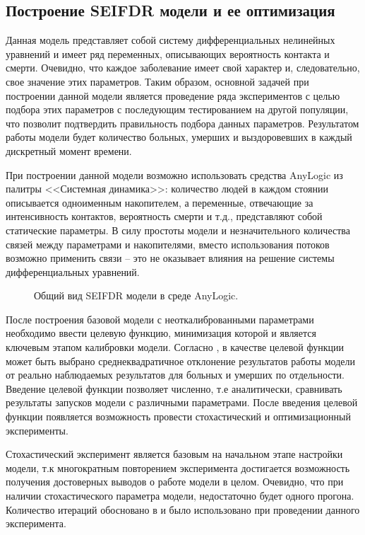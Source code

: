 \subsection{Построение SEIFDR модели и ее оптимизация}
Данная модель представляет собой систему дифференциальных нелинейных уравнений %
\cite{Wolfram_MW:SIR} и имеет ряд переменных, описывающих вероятность контакта и смерти. Очевидно, что каждое заболевание имеет свой характер и, следовательно, свое значение этих параметров. Таким образом, основной задачей при построении данной модели является проведение ряда экспериментов с целью подбора этих параметров с последующим тестированием на другой популяции, что позволит подтвердить правильность подбора данных параметров. Результатом работы модели будет  количество больных, умерших и выздоровевших в каждый дискретный момент времени.

При построении данной модели возможно использовать средства AnyLogic из палитры <<Системная динамика>>: количество людей в каждом стоянии описывается одноименным накопителем, а переменные, отвечающие за интенсивность контактов, вероятность смерти и т.д., представляют собой статические параметры. В силу простоты модели и незначительного количества связей между параметрами и накопителями, вместо использования потоков возможно применить связи -- это не оказывает влияния на решение системы дифференциальных уравнений. 


\begin{figure}[H]
	\caption{Общий вид SEIFDR модели в среде AnyLogic.}
\end{figure}


После построения базовой модели с неоткалиброванными параметрами необходимо ввести целевую функцию, минимизация которой и является ключевым этапом калибровки модели. Согласно  %
\cite[с. 26]{Bykova:2015}, в качестве  целевой функции может быть выбрано среднеквадратичное отклонение результатов работы модели от  реально наблюдаемых результатов для больных и  умерших  по отдельности. Введение целевой функции позволяет численно, т.е аналитически, сравнивать результаты запусков модели с различными параметрами.
После введения целевой функции появляется возможность провести стохастический и оптимизационный эксперименты.

Стохастический эксперимент является базовым на начальном этапе настройки модели, т.к многократным повторением эксперимента достигается возможность получения достоверных выводов о работе модели в целом. Очевидно, что при наличии стохастического параметра модели, недостаточно будет одного прогона. Количество итераций обосновано в  %
\cite{Kondratiev:2010} и было использовано при проведении данного эксперимента. 

